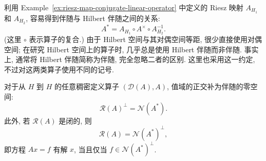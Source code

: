 利用 Example~\ref{ex:riesz-map-conjugate-linear-operator} 中定义的 Riesz 映射 $A_{H_1}$ 和 $A_{H_2}$, 容易得到伴随与 Hilbert 伴随之间的关系:
\begin{equation}\label{eq:hilbert-and-banach-adjoint-riesz-relation}
A^*=A_{H_1}\circ A^\times\circ A_{H_2}^{-1}.
\end{equation}
(这里 $\circ$ 表示算子的复合.) 由于 Hilbert 空间与其对偶空间等距, 很少直接使用对偶空间; 在研究 Hilbert 空间上的算子时, 几乎总是使用 Hilbert 伴随而非伴随. 事实上, 通常将 Hilbert 伴随简称为伴随, 完全忽略二者的区别. 这里也采用这一约定, 不过对这两类算子使用不同的记号.

\begin{Theorem}
\label{thm:range-complement-adjoint-nullspace}
对于从 $H$ 到 $H$ 的任意稠密定义算子 $(\mathcal{D}(A),A)$, 值域的正交补为伴随的零空间:
\begin{equation}\label{eq:range-orthogonal-complement-adjoint-nullspace}
\mathcal{R}(A)^\perp=\mathcal{N}(A^*).
\end{equation}
此外, 若 $\mathcal{R}(A)$ 是闭的, 则
\begin{equation}\label{eq:closed-range-adjoint-nullspace-complement}
\mathcal{R}(A)=\mathcal{N}(A^*)^\perp,
\end{equation}
即方程 $Ax=f$ 有解 $x$, 当且仅当 $f\in\mathcal{N}(A^*)^\perp$.
\end{Theorem}

\begingroup
{}
\renewcommand{\endProof}{\par\nobreak\hfill$\blacksquare$\par\vspace{0.1cm}}
\endgroup
